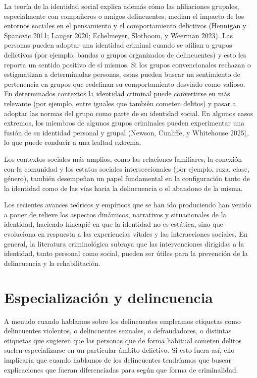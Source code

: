 \documentclass[
  spanish,
  letterpaper,
  DIV=11,
  numbers=noendperiod]{scrreprt}
\begin{document}
La teoría de la identidad social explica además cómo las afiliaciones
grupales, especialmente con compañeros o amigos delincuentes, median el
impacto de los entornos sociales en el pensamiento y el comportamiento
delictivos (Hennigan y Spanovic 2011; Lauger 2020; Echelmeyer, Slotboom,
y Weerman 2023). Las personas pueden adoptar una identidad criminal
cuando se afilian a grupos delictivos (por ejemplo, bandas o grupos
organizados de delincuentes) y esto les reporta un sentido positivo de
sí mismos. Si los grupos convencionales rechazan o estigmatizan a
determinadas personas, estas pueden buscar un sentimiento de pertenencia
en grupos que redefinan su comportamiento desviado como valioso. En
determinados contextos la identidad criminal puede convertirse en más
relevante (por ejemplo, entre iguales que también cometen delitos) y
pasar a adoptar las normas del grupo como parte de su identidad social.
En algunos casos extremos, los miembros de algunos grupos criminales
pueden experimentar una fusión de su identidad personal y grupal
(Newson, Cunliffe, y Whitehouse 2025), lo que puede conducir a una
lealtad extrema.

Los contextos sociales más amplios, como las relaciones familiares, la
conexión con la comunidad y los estatus sociales interseccionales (por
ejemplo, raza, clase, género), también desempeñan un papel fundamental
en la configuración tanto de la identidad como de las vías hacia la
delincuencia o el abandono de la misma.

Los recientes avances teóricos y empíricos que se han ido produciendo
han venido a poner de relieve los aspectos dinámicos, narrativos y
situacionales de la identidad, haciendo hincapié en que la identidad no
es estática, sino que evoluciona en respuesta a las experiencias vitales
y las interacciones sociales. En general, la literatura criminológica
subraya que las intervenciones dirigidas a la identidad, tanto personal
como social, pueden ser útiles para la prevención de la delincuencia y
la rehabilitación.

\section{Especialización y
delincuencia}\label{especializaciuxf3n-y-delincuencia}

A menudo cuando hablamos sobre los delincuentes empleamos etiquetas como
delincuentes violentos, o delincuentes sexuales, o defraudadores, o
distintas etiquetas que sugieren que las personas que de forma habitual
cometen delitos suelen especializarse en un particular ámbito delictivo.
Si esto fuera así, ello implicaría que cuando hablamos de los
delincuentes tendríamos que buscar explicaciones que fueran
diferenciadas para según que forma de criminalidad.
\end{document}
